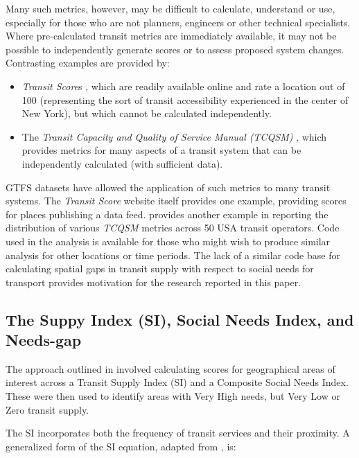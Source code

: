 \documentclass[preprint, 3p,
authoryear]{elsarticle} %
\begin{document}
Many such metrics, however, may be difficult to calculate, understand or
use, especially for those who are not planners, engineers or other
technical specialists. Where pre-calculated transit metrics are
immediately available, it may not be possible to independently generate
scores or to assess proposed system changes. Contrasting examples are
provided by:

\begin{itemize}
\item
  \emph{Transit Score}s \citep{WalkScore:2023tg}, which are readily
  available online and rate a location out of 100 (representing the sort
  of transit accessibility experienced in the center of New York), but
  which cannot be calculated independently.
\item
  The \emph{Transit Capacity and Quality of Service Manual (TCQSM)}
  \citep{TCQSM:2013}, which provides metrics for many aspects of a
  transit system that can be independently calculated (with sufficient
  data).
\end{itemize}

GTFS datasets have allowed the application of such metrics to many
transit systems. The \emph{Transit Score} website itself provides one
example, providing scores for places publishing a data feed.
\citet{Wong:2013aa} provides another example in reporting the
distribution of various \emph{TCQSM} metrics across 50 USA transit
operators. Code used in the \citet{Wong:2013aa} analysis is available
for those who might wish to produce similar analysis for other locations
or time periods. The lack of a similar code base for calculating spatial
gaps in transit supply with respect to social needs for transport
provides motivation for the research reported in this paper.

\subsection{The Suppy Index (SI), Social Needs Index, and
Needs-gap}\label{the-suppy-index-si-social-needs-index-and-needs-gap}

The approach outlined in \citet{currie2010identifying} involved
calculating scores for geographical areas of interest across a Transit
Supply Index (SI) and a Composite Social Needs Index. These were then
used to identify areas with Very High needs, but Very Low or Zero
transit supply.

The SI incorporates both the frequency of transit services and their
proximity. A generalized form of the SI equation, adapted from
\citet{currie2010identifying}, is:
\end{document}
